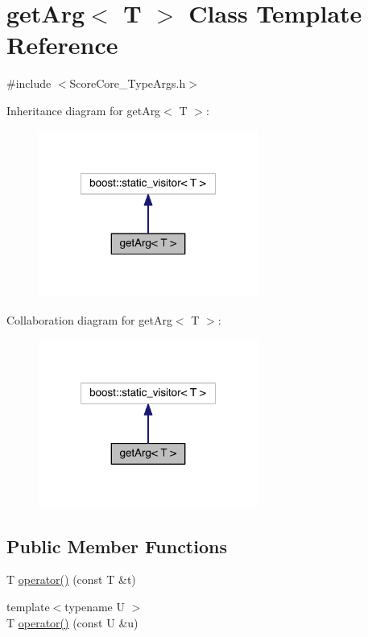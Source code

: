 \hypertarget{classget_arg}{\section{get\-Arg$<$ T $>$ Class Template Reference}
\label{classget_arg}
}


{\ttfamily \#include $<$Score\-Core\-\_\-\-Type\-Args.\-h$>$}



Inheritance diagram for get\-Arg$<$ T $>$\-:\nopagebreak
\begin{figure}[H]
\begin{center}
\leavevmode
\includegraphics[width=204pt]{classget_arg__inherit__graph}
\end{center}
\end{figure}


Collaboration diagram for get\-Arg$<$ T $>$\-:\nopagebreak
\begin{figure}[H]
\begin{center}
\leavevmode
\includegraphics[width=204pt]{classget_arg__coll__graph}
\end{center}
\end{figure}
\subsection*{Public Member Functions}
\begin{DoxyCompactItemize}
\item 
T \hyperlink{classget_arg_a1cac113349006ef4fef741a43d826f94}{operator()} (const T \&t)
\item 
{\footnotesize template$<$typename U $>$ }\\T \hyperlink{classget_arg_a672364205c4d709a72596a285bcecae7}{operator()} (const U \&u)
\end{DoxyCompactItemize}


